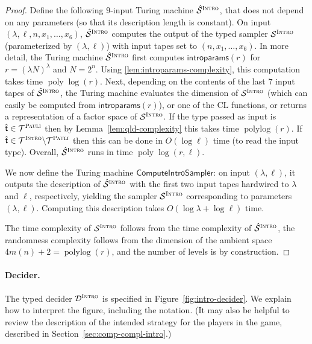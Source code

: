 \documentclass[11pt]{article}
\theoremstyle{definition}
\DeclareMathOperator{\poly}{poly}
\DeclareMathOperator{\polylog}{polylog}
\newcommand{\sampler}{\mathcal{S}}
\newcommand{\decider}{\mathcal{D}}
\newcommand{\type}{\mathcal{T}}
\newcommand{\gamestyle}[1]{\ensuremath{\textsc{#1}}\xspace}
\newcommand{\pauli}{\gamestyle{Pauli}}
\newcommand{\intro}{\gamestyle{Intro}}
\newcommand{\tvarstyle}[1]{\mathsf{#1}}
\newcommand{\tvar}{\ensuremath{\tvarstyle{t}}}
\renewcommand{\cal}[1]{\mathcal{#1}}
\newcommand{\introparams}{\mathsf{introparams}}
\newcommand{\tmstyle}[1]{\ensuremath{\mathsf{#1}}}
\newcommand{\ComputeIntroSampler}{\tmstyle{ComputeIntroSampler}}
\begin{document}
\begin{proof}
  Define the following $9$-input Turing machine
  $\hat{\cal{S}}^\intro$, that does not depend on any parameters (so that its description length is constant). 
  On input $(\lambda, \ell, n, x_1, \ldots, x_6)$, $\hat{\cal{S}}^\intro$
  computes the output of the typed sampler $\sampler^\intro$ (parameterized by
  $(\lambda, \ell)$) with input tapes set to $(n, x_1, \ldots, x_6)$.
  In more detail, the Turing machine $\hat{\cal{S}}^\intro$ first computes
  $\introparams(r)$ for $r=(\lambda N)^\lambda$ and $N=2^n$.
  Using \cref{lem:introparams-complexity}, this computation takes time
  $\poly\log(r)$.
  Next, depending on the contents of the last $7$ input tapes of
  $\hat{\cal{S}}^\intro$, the Turing machine evaluates the dimension of
  $\sampler^\intro$ (which can easily be computed from $\introparams(r)$), or
  one of the CL functions, or returns a representation of a factor space of
  $\sampler^\intro$.
  If the type passed as input is $\hat{\tvar} \in \type^\pauli$ then by
  Lemma~\ref{lem:qld-complexity} this takes time $\polylog(r)$.
  If $\hat{\tvar} \in \type^\intro\backslash\type^\pauli$ then this can be done
  in $O(\log \ell)$ time (to read the input type).
  Overall, $\hat{\cal{S}}^\intro$ runs in time $\poly\log(r,\ell)$.
  
  We now define the Turing machine $\ComputeIntroSampler$: on input
  $(\lambda,\ell)$, it outputs the description of $\hat{\cal{S}}^\intro$ with
  the first two input tapes hardwired to $\lambda$ and $\ell$, respectively,
  yielding the sampler $\sampler^\intro$ corresponding to parameters
  $(\lambda,\ell)$.
  Computing this description takes $O(\log \lambda + \log \ell)$ time.
  
  The time complexity of $\sampler^\intro$ follows from the time complexity of
  $\hat{\cal{S}}^\intro$, the randomness complexity follows from the dimension
  of the ambient space $4m(n) + 2 = \polylog(r)$, and the number of levels is by
  construction.
\end{proof}

\paragraph{Decider.}
The typed decider $\decider^\intro$ is specified in
Figure~\ref{fig:intro-decider}.
We explain how to interpret the figure, including the notation.
(It may also be helpful to review the description of the intended strategy for
the players in the game, described in Section~\ref{sec:comp-compl-intro}.)
\end{document}

